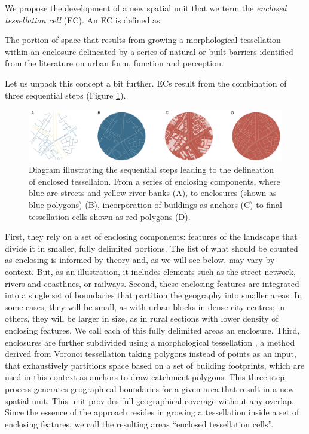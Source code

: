 We propose the development of a new spatial unit that we term the
\textit{enclosed tessellation cell} (EC).
An EC is defined as:
\begin{theorem}
        The portion of space that results from growing a morphological
tessellation within an enclosure delineated by a series of natural or built
barriers identified from the literature on urban form, function and perception.
\end{theorem}
Let us unpack this concept a bit further. ECs result from the combination of
three sequential steps (Figure \ref{fig:et_diagram}).

\begin{figure}
\includegraphics[width=\linewidth]{figures/et_diagram.pdf}
\caption{Diagram illustrating the sequential steps leading to the delineation of
enclosed tessellaion. From a series of enclosing components, where blue are streets and
yellow river banks (A), to enclosures (shown as blue polygons) (B),
incorporation of buildings as anchors (C) to final tessellation cells shown as red polygons (D).}
\label{fig:et_diagram}
\end{figure}


First, they rely on a set of enclosing components: features of the landscape
that divide it in smaller, fully delimited portions. The list of what should be
counted as enclosing is informed by theory and, as we will see below, may vary
by context. But, as an illustration, it includes elements such as the street
network, rivers and coastlines, or railways.
Second, these enclosing features are integrated into a single set of boundaries
that partition the geography into smaller areas. In some cases, they will be
small, as with urban blocks in dense city centres; in others, they will be
larger in size, as in rural sections with lower density of enclosing features.
We call each of this fully delimited areas an enclosure.
Third, enclosures are further subdivided using a morphological tessellation
\citep{fleischmann2020morphological}, a method derived from Voronoi tessellation taking polygons instead of points as an input,
that exhaustively partitions space based on a set of building footprints,
which are used in this context as anchors to draw catchment polygons.
This three-step process generates geographical boundaries for a given area that result in a
new spatial unit. This unit provides full geographical coverage without any
overlap.
%
Since the essence of the approach resides in growing a tessellation inside a set
of enclosing features, we call the resulting areas ``enclosed tessellation
cells''.

